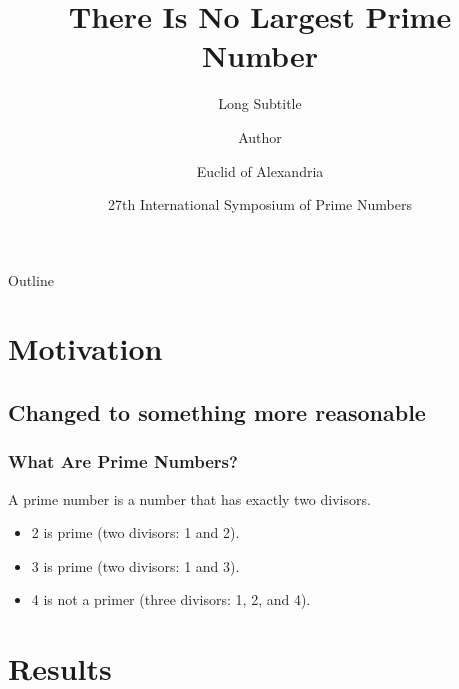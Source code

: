 \documentclass{beamer}
\title[Short] %
{There Is No Largest Prime Number}
\subtitle[Short Subtitle]
{Long Subtitle}
\author[Author, Euclid]{Author\inst{1} \and Euclid of Alexandria\inst{2}}
\institute[Universities of Somewhere and Alexandria] %
{
  \inst{1}%
  Department of Computer Science\\ %
  University of Somewhere
  \and
  \inst{2}%
  Department of Philosophy\\
  University of Alexandria
}
\date[ISPN ?80]{27th International Symposium of Prime Numbers}
\begin{document}
  
  \begin{frame}
    \titlepage %
  \end{frame}
  
  \begin{frame}{Outline}
    \tableofcontents[pausesections] %
  \end{frame}
  
  \section{Motivation}
  
  \subsection{Changed to something more reasonable}
  
  \begin{frame}
    \frametitle{What Are Prime Numbers?}
    \begin{definition}
      A \alert{prime number} is a number that has exactly two divisors.
    \end{definition}
    \begin{example}
      \begin{itemize}
        \item 2 is prime (two divisors: 1 and 2).
        \item 3 is prime (two divisors: 1 and 3).
        \item 4 is not a primer (\alert{three} divisors: 1, 2, and 4).
      \end{itemize}
    \end{example} 
  \end{frame}
  \section{Results}
\end{document}
